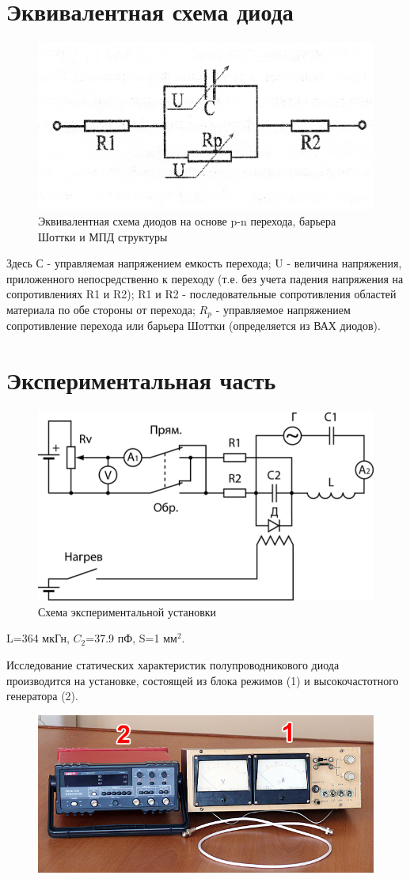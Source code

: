 \section{Эквивалентная схема диода}
\begin{figure}[h!]
	\centering
	\includegraphics[width=0.5\linewidth]{imgs/fig4.jpg}
	\caption{Эквивалентная схема диодов на основе p-n перехода, барьера Шоттки и МПД структуры}
	\label{fig:4}
\end{figure}

Здесь С - управляемая напряжением емкость перехода; U - величина напряжения, приложенного непосредственно к переходу (т.е. без учета падения напряжения на сопротивлениях R1 и R2); R1 и R2 - последовательные сопротивления областей материала по обе стороны от перехода; $R_p$ - управляемое напряжением сопротивление перехода или барьера Шоттки (определяется из ВАХ диодов).

\newpage
\section{Экспериментальная часть}
\begin{figure}[h!]
	\centering
	\includegraphics[width=0.5\linewidth]{imgs/fig5.jpg}
	\caption{Схема экспериментальной установки}
	\label{fig:5}
\end{figure}

L=364 мкГн, $C_2$=37.9 пФ, S=1 мм$^2$.

Исследование статических характеристик полупроводникового диода производится на установке, состоящей из блока режимов
(1) и высокочастотного генератора (2).
\begin{figure}[h!]
	\centering
	\includegraphics[width=0.6\linewidth]{imgs/fig6.jpg}
	\caption{}
	\label{fig:6}
\end{figure}

